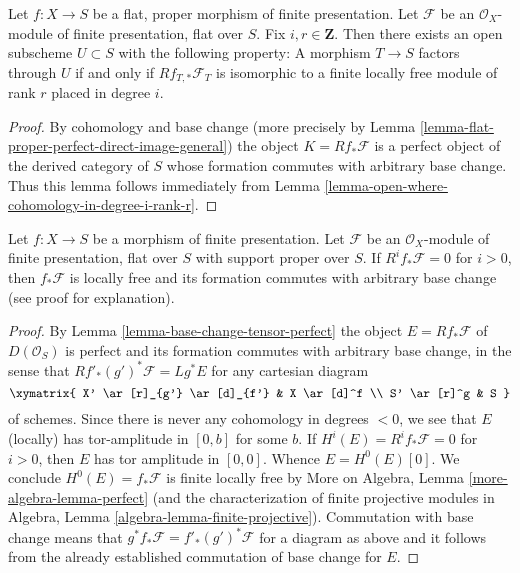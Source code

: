 \begin{lemma}
\label{lemma-open-where-cohomology-in-degree-i-rank-r-geometric}
Let $f : X \to S$ be a flat, proper morphism of finite presentation.
Let $\mathcal{F}$ be an $\mathcal{O}_X$-module of finite presentation,
flat over $S$. Fix $i, r \in \mathbf{Z}$.
Then there exists an open subscheme
$U \subset S$ with the following property:
A morphism $T \to S$ factors through $U$ if and only if
$Rf_{T, *}\mathcal{F}_T$ is isomorphic to a
finite locally free module of rank $r$ placed in degree $i$.
\end{lemma}

\begin{proof}
By cohomology and base change (more precisely by
Lemma \ref{lemma-flat-proper-perfect-direct-image-general})
the object $K = Rf_*\mathcal{F}$ is a perfect object of the derived
category of $S$ whose formation commutes with arbitrary base change.
Thus this lemma follows immediately from
Lemma \ref{lemma-open-where-cohomology-in-degree-i-rank-r}.
\end{proof}

\begin{lemma}
\label{lemma-vanishing-implies-locally-free}
Let $f : X \to S$ be a morphism of finite presentation.
Let $\mathcal{F}$ be an $\mathcal{O}_X$-module of finite presentation,
flat over $S$ with support proper over $S$. If $R^if_*\mathcal{F} = 0$
for $i > 0$, then $f_*\mathcal{F}$ is locally free and its formation
commutes with arbitrary base change (see proof for explanation).
\end{lemma}

\begin{proof}
By Lemma \ref{lemma-base-change-tensor-perfect}
the object $E = Rf_*\mathcal{F}$ of $D(\mathcal{O}_S)$
is perfect and its formation commutes with arbitrary base change,
in the sense that $Rf'_*(g')^*\mathcal{F} = Lg^*E$
for any cartesian diagram
$$
\xymatrix{
X' \ar[r]_{g'} \ar[d]_{f'} &
X \ar[d]^f \\
S' \ar[r]^g &
S
}
$$
of schemes.
Since there is never any cohomology in degrees $< 0$, we see that
$E$ (locally) has tor-amplitude in $[0, b]$ for some $b$.
If $H^i(E) = R^if_*\mathcal{F} = 0$ for $i > 0$,
then $E$ has tor amplitude in $[0, 0]$. Whence
$E = H^0(E)[0]$. We conclude $H^0(E) = f_*\mathcal{F}$
is finite locally free by
More on Algebra, Lemma \ref{more-algebra-lemma-perfect}
(and the characterization of finite projective modules
in Algebra, Lemma \ref{algebra-lemma-finite-projective}).
Commutation with base change means that
$g^*f_*\mathcal{F} = f'_*(g')^*\mathcal{F}$ for
a diagram as above and it follows from the already
established commutation of base change for $E$.
\end{proof}

